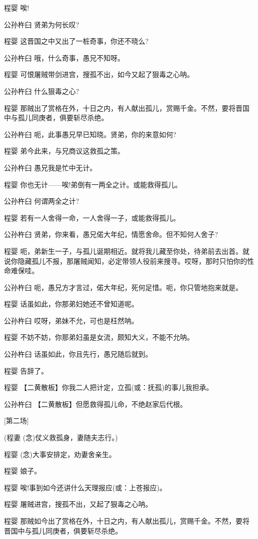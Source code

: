 程婴 唉!

公孙杵臼 贤弟为何长叹?

程婴 这晋国之中又出了一桩奇事，你还不晓么?

公孙杵臼 哦，什么奇事，愚兄不知呀。

程婴 可恨屠贼带剑进宫，搜孤不出，如今又起了狠毒之心呐。

公孙杵臼 什么狠毒之心?

程婴
那贼出了赏格在外，十日之内，有人献出孤儿，赏赐千金。不然，要将晋国中与孤儿同庚者，俱要斩尽杀绝。

公孙杵臼 呃，此事愚兄早已知晓。贤弟，你的来意如何?

程婴 弟今此来，与兄商议这救孤之策。

公孙杵臼 愚兄我是忙中无计。

程婴 你也无计------唉!弟倒有一两全之计。或能救得孤儿。

公孙杵臼 何谓两全之计?

程婴 若有一人舍得一命，一人舍得一子，或能救得孤儿。

公孙杵臼 贤弟，你来看，愚兄偌大年纪，情愿舍命。但不知何人舍子?

程婴
呃，弟新生一子，与孤儿诞期相近。就将我儿藏至你处，待弟前去出首。就说你隐藏孤儿不报，那屠贼闻知，必定带领人役前来搜寻。哎呀，那时只怕你的性命难保哇。

公孙杵臼 呃，愚兄方才言过，偌大年纪，死何足惜。呃，你只管地抱来就是。

程婴 话虽如此，你那弟妇她还不曾知道呢。

公孙杵臼 哎呀，弟妹不允，可也是枉然呐。

程婴 不妨不妨，你那弟妇虽是女流，颇知大义，不能不允呐。

公孙杵臼 话虽如此，你且先行，愚兄随后就到。

程婴 告辞了。

程婴 【二黄散板】你我二人把计定，立孤(或：抚孤)的事儿我担承。

公孙杵臼 【二黄散板】但愿救得孤儿命，不绝赵家后代根。

{[}第二场{]}

(程妻 (念)仗义救孤身，妻随夫志行。)

程婴 (念)大事安排定，劝妻舍亲生。

程婴 娘子。

程婴 唉!事到如今还讲什么天理报应(或：上苍报应)。

程婴 屠贼进宫，搜孤不出，又起了狠毒之心呐。

程婴
那贼如今出了赏格在外，十日之内，有人献出孤儿，赏赐千金。不然，要将晋国中与孤儿同庚者，俱要斩尽杀绝。

